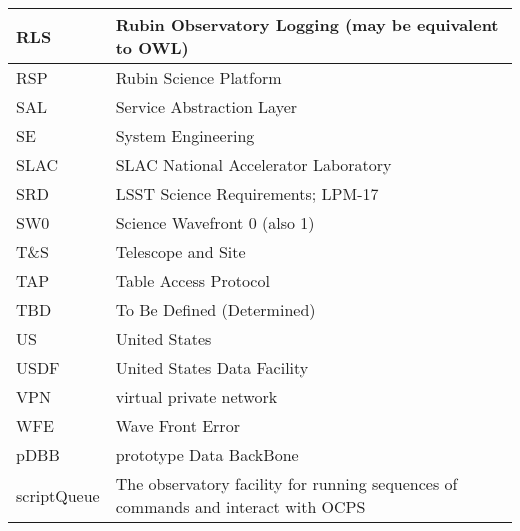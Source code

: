 \begin{longtable}{p{}p{}}
RLS & Rubin Observatory Logging (may be equivalent to OWL) \\\hline
RSP & Rubin Science Platform \\\hline
SAL & Service Abstraction Layer \\\hline
SE & System Engineering \\\hline
SLAC & SLAC National Accelerator Laboratory \\\hline
SRD & LSST Science Requirements; LPM-17 \\\hline
SW0 & Science Wavefront 0 (also 1) \\\hline
T\&S & Telescope and Site \\\hline
TAP & Table Access Protocol \\\hline
TBD & To Be Defined (Determined) \\\hline
US & United States \\\hline
USDF & United States Data Facility \\\hline
VPN & virtual private network \\\hline
WFE & Wave Front Error \\\hline
pDBB & prototype Data BackBone \\\hline
scriptQueue & The observatory facility for running sequences of commands and interact with \gls{OCPS} \\\hline
\end{longtable}
